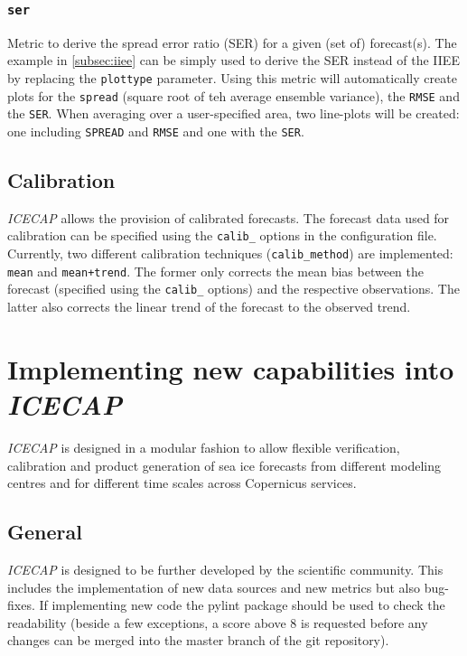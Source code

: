 \documentclass[DIV=10, parskip=full]{scrreprt}
\newcommand{\ice}{\textit{ICECAP}\xspace}
\newcommand{\notimplement}[1]{#1}
\begin{document}
\subsection{\texttt{ser}}
Metric to derive the spread error ratio (SER) for a given (set of) forecast(s). The example in \ref{subsec:iiee} can be simply used to derive the SER instead of the IIEE by replacing the \texttt{plottype} parameter. Using this metric will automatically create plots for the \texttt{spread} (square root of teh average ensemble variance), the \texttt{RMSE} and the \texttt{SER}. When averaging over a user-specified area, two line-plots will be created: one including \texttt{SPREAD} and \texttt{RMSE} and one with the \texttt{SER}.

\section{Calibration}
\ice allows the provision of calibrated forecasts. The forecast data used for calibration can be specified using the \texttt{calib\_} options in the configuration file. \notimplement{Currently, two different calibration techniques (\texttt{calib\_method}) are implemented: \texttt{mean} and \texttt{mean+trend}}. The former only corrects the mean bias between the forecast (specified using the \texttt{calib\_} options) and the respective  observations. The latter also corrects the linear trend of the forecast to the observed trend.  

\chapter{Implementing new capabilities into  \ice}\label{chap:develop}
\ice is designed in a modular fashion to allow flexible verification, calibration and product generation of sea ice forecasts from different modeling centres and for different time scales across Copernicus services. 

\section{General}
\ice is designed to be further developed by the scientific community. This includes the implementation of new data sources and new metrics but also bug-fixes. If implementing new code the pylint package should be used to check the readability (beside a few exceptions, a score above 8 is requested before any changes can be merged into the master branch of the git repository).
\end{document}
